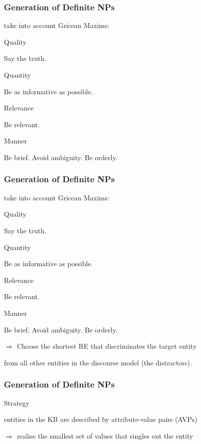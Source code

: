 \documentclass[compress,color=usenames]{beamer}
\begin{document}
\begin{frame}
\frametitle{Generation of Deﬁnite NPs}

take into account Gricean Maxims:

Quality

Say the truth.

Quantity

Be as informative as possible.

Relevance

Be relevant.

Manner

Be brief. Avoid ambiguity. Be orderly.

\end{frame}

\begin{frame}
\frametitle{Generation of Deﬁnite NPs}

take into account Gricean Maxims:

Quality

Say the truth.

Quantity

Be as informative as possible.

Relevance

Be relevant.

Manner

Be brief. Avoid ambiguity. Be orderly.

$\Rightarrow$ Choose the shortest RE that discriminates the target entity

from all other entities in the discourse model (the distractors).

\end{frame}

\begin{frame}
\frametitle{Generation of Deﬁnite NPs}

Strategy

entities in the KB are described by attribute-value pairs (AVPs)

$\Rightarrow$ realise the smallest set of values that singles out the entity

\end{frame}
\end{document}
